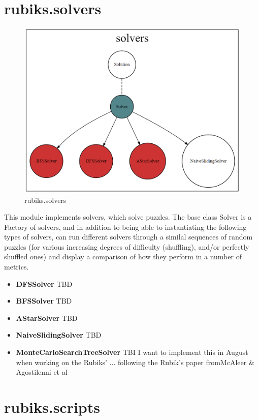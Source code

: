 \section{rubiks.solvers}
\begin{figure}[H]
\centering
\includegraphics[scale=0.25]{./Figures/codebasesolvers}
\caption[Codebase]{rubiks.solvers}
\label{fig:Codebasesolvers}
\end{figure}
This module implements solvers, which solve puzzles. The base class Solver is a Factory of solvers, and in addition to being able to instantiating the following types of solvers, can run different solvers through a similal sequences of random puzzles (for various increasing degrees of difficulty (shuffling), and/or perfectly shuffled ones) and display a comparison of how they perform in a number of metrics.

\begin{itemize}
\item \textbf{DFSSolver} TBD
\item \textbf{BFSSolver} TBD
\item \textbf{AStarSolver} TBD
\item \textbf{NaiveSlidingSolver} TBD
\item \textbf{MonteCarloSearchTreeSolver} TBI I want to implement this in August when working on the Rubiks' ... following the Rubik's paper fromMcAleer \& Agostilenni et al \cite{https://doi.org/10.48550/arxiv.1805.07470}
\end{itemize}

\section{rubiks.scripts}

